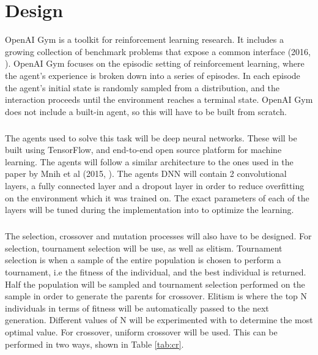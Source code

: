 \chapter{Design}

OpenAI Gym is a toolkit for reinforcement learning research. It includes a growing collection of benchmark problems that expose a common interface (2016, \cite{gym}). OpenAI Gym focuses on the episodic setting of reinforcement learning, where the agent's experience is broken down into a series of episodes. In each episode the agent's initial state is randomly sampled from a distribution, and the interaction proceeds until the environment reaches a terminal state. OpenAI Gym does not include a built-in agent, so this will have to be built from scratch.

\paragraph{}

The agents used to solve this task will be deep neural networks. These will be built using TensorFlow, and end-to-end open source platform for machine learning. The agents will follow a similar architecture to the ones used in the paper by Mnih et al (2015, \cite{mnih}). The agents DNN will contain 2 convolutional layers, a fully connected layer and a dropout layer in order to reduce overfitting on the environment which it was trained on. The exact parameters of each of the layers will be tuned during the implementation into to optimize the learning.

\paragraph{}

The selection, crossover and mutation processes will also have to be designed. For selection, tournament selection will be use, as well as elitism. Tournament selection is when a sample of the entire population is chosen to perform a tournament, i.e the fitness of the individual, and the best individual is returned. Half the population will be sampled and tournament selection performed on the sample in order to generate the parents for crossover. Elitism is where the top N individuals in terms of fitness will be automatically passed to the next generation. Different values of N will be experimented with to determine the most optimal value. For crossover, uniform crossover will be used. This can be performed in two ways, shown in Table \ref{tab:cr}.

